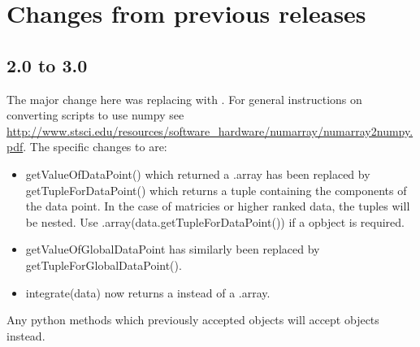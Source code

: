 
%
%
%

\section{Changes from previous releases}
\label{app:changes}

\subsection*{2.0 to 3.0}
The major change here was replacing  with \numpy.
For general instructions on converting scripts to use numpy see \url{http://www.stsci.edu/resources/software_hardware/numarray/numarray2numpy.pdf}.
The specific changes to \escript are:
\begin{itemize}
  \item getValueOfDataPoint() which returned a .array has been replaced by
 getTupleForDataPoint() which returns a \PYTHON tuple containing
the components of the data point. In the case of matricies or higher ranked data, the tuples will be nested. Use 
\numpy.array(data.getTupleForDataPoint()) if a \numpyNDA opbject is required.
 \item getValueOfGlobalDataPoint has similarly been replaced by getTupleForGlobalDataPoint().
 \item integrate(data) now returns a \numpyNDA instead of a .array.
\end{itemize}
Any python methods which previously accepted  objects will accept \numpy objects instead.


